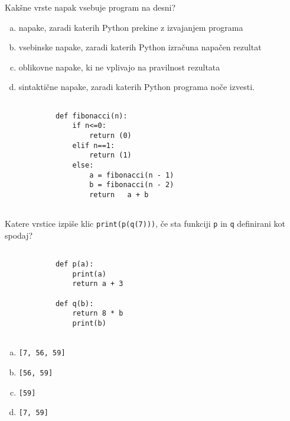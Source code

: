 \documentclass[arhiv, 10pt]{../izpit}
\newcommand{\inlinepy}[1]{\texttt{#1}}
\begin{document}
        \naloga*
        \begin{multicols}{2}
        \noindent
        Kakšne vrste napak vsebuje program na desni?

        \begin{enumerate}[(a)]
\item napake, zaradi katerih Python prekine z izvajanjem programa
\item vsebinske napake, zaradi katerih Python izračuna napačen rezultat
\item oblikovne napake, ki ne vplivajo na pravilnost rezultata
\item sintaktične napake, zaradi katerih Python programa noče izvesti.
\end{enumerate}

        \columnbreak

        \begin{verbatim}
        
            def fibonacci(n):
                if n<=0:
                    return (0)
                elif n==1:
                    return (1)
                else:
                    a = fibonacci(n - 1)
                    b = fibonacci(n - 2)
                    return   a + b
            
        \end{verbatim}

        \end{multicols}

    
        \naloga*
        Katere vrstice izpiše klic \inlinepy{print(p(q(7)))}, če sta funkciji \inlinepy{p} in \inlinepy{q} definirani kot spodaj?

        \begin{multicols}{2}
        \begin{verbatim}
        
            def p(a):
                print(a)
                return a + 3

            def q(b):
                return 8 * b
                print(b)
        
        \end{verbatim}

        \begin{enumerate}[(a)]
\item \inlinepy{[7, 56, 59]}
\item \inlinepy{[56, 59]}
\item \inlinepy{[59]}
\item \inlinepy{[7, 59]}
\end{enumerate}

        \end{multicols}
    
\end{document}
